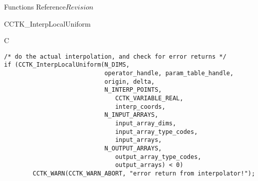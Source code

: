 \begin{cactuspart}{ Functions Reference}{}{$Revision$}
\begin{FunctionDescription}{CCTK\_InterpLocalUniform}
\begin{ExampleSection}
\begin{Example}{C}
\begin{verbatim}
/* do the actual interpolation, and check for error returns */
if (CCTK_InterpLocalUniform(N_DIMS,
                            operator_handle, param_table_handle,
                            origin, delta,
                            N_INTERP_POINTS,
                               CCTK_VARIABLE_REAL,
                               interp_coords,
                            N_INPUT_ARRAYS,
                               input_array_dims,
                               input_array_type_codes,
                               input_arrays,
                            N_OUTPUT_ARRAYS,
                               output_array_type_codes,
                               output_arrays) < 0)
        CCTK_WARN(CCTK_WARN_ABORT, "error return from interpolator!");
\end{verbatim}
\end{Example}
\end{ExampleSection}
\end{FunctionDescription}



\end{cactuspart}

